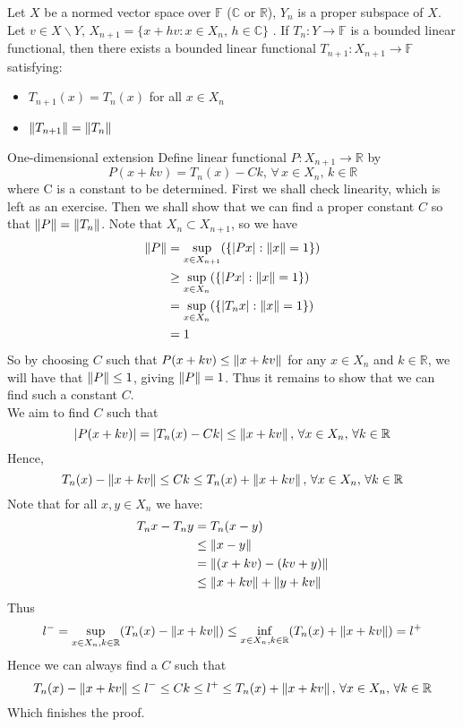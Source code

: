\begin{lemma}\label{ODEX}\rm\nextline
	Let $X$ be a normed vector space over $\mathbb F$ ($\mathbb{C}$ or $\mathbb{R}$), $Y_n$ is a proper subspace of $X$. Let $v\in X\backslash Y$, $X_{n+1}=\{x+hv:x\in X_n,\,h\in\mathbb{C}\}$
	. If $T_n:Y\xrightarrow{}\mathbb{F}$ is a bounded linear functional, then there exists a bounded linear functional $T_{n+1}:X_{n+1}\xrightarrow{}\mathbb{F}$ satisfying:
	\begin{itemize}
		\item $T_{n+1}(x)=T_n(x)$ for all $x\in X_n$
		\item $\left\|{T_{n+1}}\right\|=\left\|{T_n}\right\|$
	\end{itemize}
	\begin{pf}{One-dimensional extension}{}
		Define linear functional $P:X_{n+1}\xrightarrow{}\mathbb{R}$ by
		$$
			P(x+kv)=T_n(x)-Ck,\,\forall\,x\in X_n,\,k\in\mathbb{R}
		$$
		where C is a constant to be determined.
		First we shall check linearity, which is left as an exercise.
		Then we shall show that we can find a proper constant $C$ so that $\left\|{P}\right\|=\left\|{T_n}\right\|$. Note that $X_n\subset X_{n+1}$, so we have
		\begin{equation}
			\begin{split}
				\left\|{P}\right\|&=\sup_{x\in X_{n+1}}(\{|Px|:\left\|{x}\right\|=1\})\\
				&\geq\sup_{x\in X_{n}}(\{|Px|:\left\|{x}\right\|=1\})\\
				&=\sup_{x\in X_{n}}(\{|T_nx|:\left\|{x}\right\|=1\})\\
				&=1
			\end{split}
		\end{equation}
		So by choosing $C$ such that $P(x+kv)\leq \left\|{x+kv}\right\|$ for any $x\in X_n$ and $k\in \mathbb{R}$, we will have that $\left\|{P}\right\|\leq 1$, giving $\left\|{P}\right\|=1$. Thus it remains to show that we can find such a constant $C$.\\
		We aim to find $C$ such that
		$$
			|P(x+kv)|=|T_n(x)-Ck|\leq \left\|{x+kv}\right\|,\,\forall x\in X_n,\,\forall k\in\mathbb{R}
		$$
		Hence,
		$$
			T_n(x)-\left\|{x+kv}\right\|\leq Ck\leq T_n(x)+\left\|{x+kv}\right\|,\,\forall x\in X_n,\,\forall k\in\mathbb{R}
		$$
		Note that for all $x,y\in X_n$ we have:
		\begin{equation}
			\begin{split}
				T_nx-T_ny&=T_n(x-y)\\
				&\leq \left\|{x-y}\right\|\\
				&=\left\|{(x+kv)-(kv+y)}\right\|\\
				&\leq\left\|{x+kv}\right\|+\left\|{y+kv}\right\|
			\end{split}
		\end{equation}
		Thus
		$$
			l^-=\sup_{x\in X_n,k\in\mathbb{R}}(T_n(x)-\left\|{x+kv}\right\|)\leq  \inf_{x\in X_n,k\in\mathbb{R}}(T_n(x)+\left\|{x+kv}\right\|)=l^+
		$$
		Hence we can always find a $C$ such that
		$$
			T_n(x)-\left\|{x+kv}\right\|\leq l^-\leq Ck\leq l^+ \leq T_n(x)+\left\|{x+kv}\right\|,\,\forall x\in X_n,\,\forall k\in\mathbb{R}
		$$
		Which finishes the proof.
	\end{pf}
\end{lemma}
